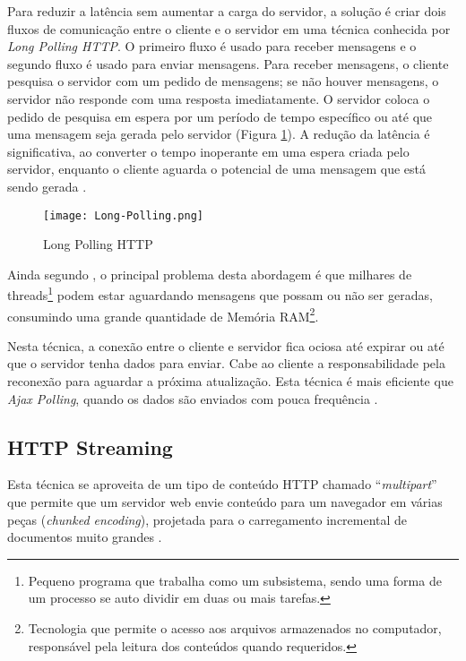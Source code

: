 Para reduzir a latência sem aumentar a carga do servidor, a solução é criar dois fluxos de comunicação entre o cliente e o servidor em uma técnica conhecida por \emph{Long Polling HTTP}. O primeiro fluxo é usado para receber mensagens e o segundo fluxo é usado para enviar mensagens. Para receber mensagens, o cliente pesquisa o servidor com um pedido de mensagens; se não houver mensagens, o servidor não responde com uma resposta imediatamente. O servidor coloca o pedido de pesquisa em espera por um período de tempo específico ou até que uma mensagem seja gerada pelo servidor  (Figura \ref{fig:longPolling}). A redução da latência é significativa, ao converter o tempo inoperante em uma espera criada pelo servidor, enquanto o cliente aguarda o potencial de uma mensagem que está sendo gerada \cite{gross2006introduction}.

\begin{figure}[!htb]
	\centering
	\texttt{[image: Long-Polling.png]}
	\caption{Long Polling HTTP}
	\label{fig:longPolling}
\end{figure}

Ainda segundo , o principal problema desta abordagem é que milhares de threads\footnote{Pequeno programa que trabalha como um subsistema, sendo uma forma de um processo se auto dividir em duas ou mais tarefas.} podem estar aguardando mensagens que possam ou não ser geradas, consumindo uma grande quantidade de Memória RAM\footnote{Tecnologia que permite o acesso aos arquivos armazenados no computador, responsável pela leitura dos conteúdos quando requeridos.}.

Nesta técnica, a conexão entre o cliente e servidor fica ociosa até expirar ou até que o servidor tenha dados para enviar. Cabe ao cliente a responsabilidade pela reconexão para aguardar a próxima atualização. Esta técnica é mais eficiente que \emph{Ajax Polling}, quando os dados são enviados com pouca frequência \cite{gutwin2011real}.

\subsection{HTTP Streaming}

Esta técnica se aproveita de um tipo de conteúdo HTTP chamado “\emph{multipart}” que permite que um servidor web envie conteúdo para um navegador em várias peças (\emph{chunked encoding}), projetada para o carregamento incremental de documentos muito grandes \cite{gutwin2011}.

